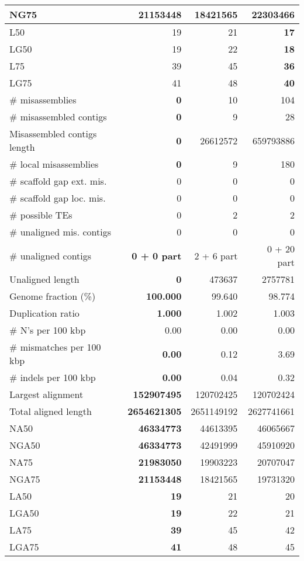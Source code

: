 \documentclass[12pt,a4paper]{article}
\begin{document}
\begin{table}[ht]
\begin{center}
\begin{tabular}{|l*{3}{|r}|}
NG75 & 21153448 & 18421565 & {\bf 22303466} \\ \hline
L50 & 19 & 21 & {\bf 17} \\ \hline
LG50 & 19 & 22 & {\bf 18} \\ \hline
L75 & 39 & 45 & {\bf 36} \\ \hline
LG75 & 41 & 48 & {\bf 40} \\ \hline
\# misassemblies & {\bf 0} & 10 & 104 \\ \hline
\# misassembled contigs & {\bf 0} & 9 & 28 \\ \hline
Misassembled contigs length & {\bf 0} & 26612572 & 659793886 \\ \hline
\# local misassemblies & {\bf 0} & 9 & 180 \\ \hline
\# scaffold gap ext. mis. & 0 & 0 & 0 \\ \hline
\# scaffold gap loc. mis. & 0 & 0 & 0 \\ \hline
\# possible TEs & 0 & 2 & 2 \\ \hline
\# unaligned mis. contigs & 0 & 0 & 0 \\ \hline
\# unaligned contigs & {\bf 0 + 0 part} & 2 + 6 part & 0 + 20 part \\ \hline
Unaligned length & {\bf 0} & 473637 & 2757781 \\ \hline
Genome fraction (\%) & {\bf 100.000} & 99.640 & 98.774 \\ \hline
Duplication ratio & {\bf 1.000} & 1.002 & 1.003 \\ \hline
\# N's per 100 kbp & 0.00 & 0.00 & 0.00 \\ \hline
\# mismatches per 100 kbp & {\bf 0.00} & 0.12 & 3.69 \\ \hline
\# indels per 100 kbp & {\bf 0.00} & 0.04 & 0.32 \\ \hline
Largest alignment & {\bf 152907495} & 120702425 & 120702424 \\ \hline
Total aligned length & {\bf 2654621305} & 2651149192 & 2627741661 \\ \hline
NA50 & {\bf 46334773} & 44613395 & 46065667 \\ \hline
NGA50 & {\bf 46334773} & 42491999 & 45910920 \\ \hline
NA75 & {\bf 21983050} & 19903223 & 20707047 \\ \hline
NGA75 & {\bf 21153448} & 18421565 & 19731320 \\ \hline
LA50 & {\bf 19} & 21 & 20 \\ \hline
LGA50 & {\bf 19} & 22 & 21 \\ \hline
LA75 & {\bf 39} & 45 & 42 \\ \hline
LGA75 & {\bf 41} & 48 & 45 \\ \hline
\end{tabular}
\end{center}
\end{table}
\end{document}
